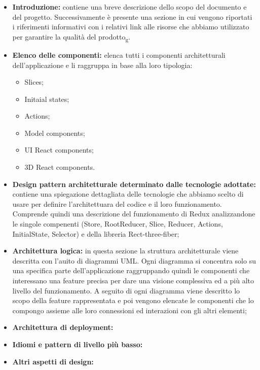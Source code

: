 \begin{itemize}
\item \textbf{Introduzione:} contiene una breve descrizione dello scopo del documento e del progetto.
Successivamente è presente una sezione in cui vengono riportati i riferimenti informativi 
con i relativi link alle risorse che abbiamo utilizzato per garantire la qualità del prodotto\textsubscript{g}.

\item \textbf{Elenco delle componenti:} elenca tutti i componenti architetturali dell'applicazione e li raggruppa in base alla loro tipologia:
\begin{itemize}
 	\item Slices;
 	\item  Initaial states;
 	\item Actions; 
 	\item Model components; 
 	\item UI React components; 
 	\item 3D React components.
\end{itemize}

\item \textbf{Design pattern architetturale determinato dalle tecnologie adottate:} contiene una spiegazione dettagliata delle tecnologie che abbiamo scelto di usare per definire l'architettuara del codice e il loro funzionamento.
Comprende quindi una descrizione del funzionamento di Redux analizzandone le singole compenenti (Store, RootReducer, Slice, Reducer, Actions, InitialState, Selector) e della libreria Rect-three-fiber;

\item \textbf{ Architettura logica:} in questa sezione la struttura architetturale viene descritta con l'auito di diagrammi UML. Ogni diagramma si concentra solo su una specifica parte dell'applicazione raggruppando quindi le componenti che interessano una feature precisa per dare una visione complessiva ed a più alto livello del funzionamento.
A seguito di ogni diagramma viene descritto lo scopo della feature rappresentata e poi vengono elencate le componenti che lo compongo assieme alle loro connessioni ed interazioni con gli altri elementi;

\item \textbf{Architettura di deployment:}

\item \textbf{Idiomi e pattern di livello più basso:}

\item \textbf{Altri aspetti di design:}

\end{itemize}